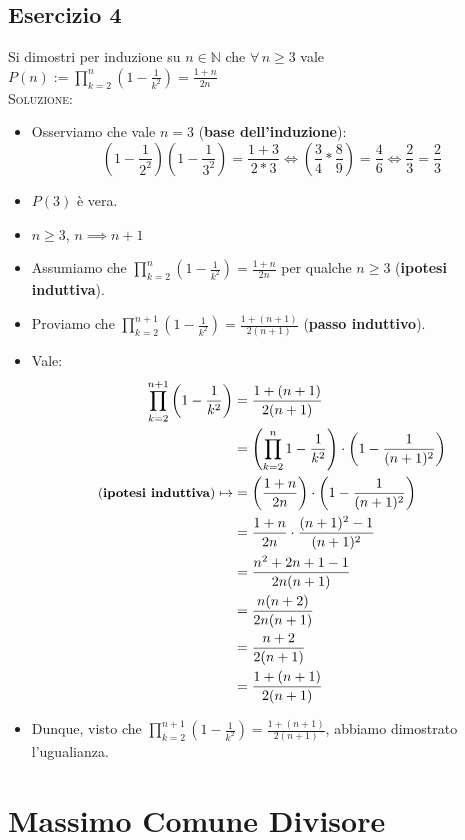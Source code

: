 \documentclass[10pt]{article}
\begin{document}
	\subsection{Esercizio 4}
	Si dimostri per induzione su $n \!\in\! \mathbb{N}$ che $\forall \, n \geq 3$ vale $P(n) := \displaystyle{\prod_{k=2}^n \left(1-\frac{1}{k^2}\right) = \frac{1+n}{2n}}$
	\\ \textsc{Soluzione:}
	\begin{itemize}
	\item
	Osserviamo che vale $n=3$ (\textbf{base dell'induzione}):
	$$\left(1-\frac{1}{2^2}\right)\left(1-\frac{1}{3^2}\right) = \frac{1+3}{2*3} \Longleftrightarrow \left(\frac{3}{4} * \frac{8}{9} \right) = \frac{4}{6} \Longleftrightarrow \frac{2}{3} = \frac{2}{3}$$
	\item
	$P(3)$ è vera.
	\item
	$n \!\geq\! 3$, $n \implies n+1$
	\item
	Assumiamo che $\displaystyle{\prod_{k=2}^n \left(1-\frac{1}{k^2}\right) = \frac{1+n}{2n}}$ per qualche $n \geq 3$ (\textbf{ipotesi induttiva}).
	\item
	Proviamo che $\displaystyle{\prod_{k=2}^{n+1} \left(1-\frac{1}{k^2}\right) = \frac{1+(n+1)}{2(n+1)}}$ (\textbf{passo induttivo}).
	\item
	Vale:
	\begin{equation}
	\begin{split}
	\prod_{k=2}^{n+1} \left(1-\frac{1}{k^2}\right) &= \frac{1+(n+1)}{2(n+1)} \\
	&= \left(\prod_{k=2}^n 1-\frac{1}{k^2}\right) \cdot \left( 1-\frac{1}{(n+1)^2} \right) \\
	\textrm{\small{(\textbf{ipotesi induttiva})}} \mapsto &= \left( \frac{1+n}{2n} \right) \cdot \left(1 - \frac{1}{(n+1)^2}  \right) \\
	&= \frac{1+n}{2n} \cdot \frac{(n+1)^2 - 1}{(n+1)^2} \\
	&= \frac{n^2 + 2n + 1 -1}{2n(n+1)} \\
	&= \frac{n(n+2)}{2n(n+1)} \\
	&= \frac{n+2}{2(n+1)} \\
	&= \frac{1 + (n+1)}{2(n+1)}
	\notag
	\end{split}
	\end{equation}
	\item
	Dunque, visto che $\displaystyle{\prod_{k=2}^{n+1} \left(1-\frac{1}{k^2}\right) = \frac{1 + (n+1)}{2(n+1)}}$, abbiamo dimostrato l'ugualianza.
	\end{itemize}
	\newpage
  \section{Massimo Comune Divisore}
\end{document}

